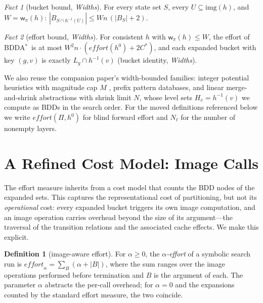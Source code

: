 \documentclass[letterpaper]{article}
\newcommand{\task}{\ensuremath{\Pi}}
\newcommand{\hblind}{\ensuremath{h^{0}}}
\newcommand{\copt}{\ensuremath{C^{*}}}
\newcommand{\width}{\ensuremath{\mathsf{w}}}
\newcommand{\effort}{\ensuremath{\mathit{effort}}}
\newcommand{\img}{\ensuremath{\mathrm{img}}}
\newcommand{\bddastar}{BDDA\ensuremath{^{*}}}
\theoremstyle{plain}
\theoremstyle{definition}
\newtheorem{definition}{Definition}
\theoremstyle{remark}
\newtheorem{fact}{Fact}
\begin{document}
\begin{fact}[bucket bound, \emph{Widths}]
\label{thm-bucket}
For every state set $S$, every $U \subseteq \img(h)$, and
$W = \width_\pi(h)$:
$|B_{S \cap h^{-1}(U)}| \leq W n \, (|B_S| + 2)$.
\end{fact}

\begin{fact}[effort bound, \emph{Widths}]
\label{thm-effort}
For consistent $h$ with $\width_\pi(h) \leq W$, the effort of \bddastar\
is at most $W^2 n \cdot (\mathit{effort}(\hblind) + 2\copt)$, and each
expanded bucket with key $(g,v)$ is exactly $L_g \cap h^{-1}(v)$
(bucket identity, \emph{Widths}).
\end{fact}

We also reuse the companion paper's width-bounded families: integer
potential heuristics with magnitude cap $M$
\citep{fiser-et-al-aij2024}, prefix pattern databases, and linear
merge-and-shrink abstractions \citep{helmert-et-al-jacm2014} with shrink
limit $N$, whose level sets $H_v = h^{-1}(v)$ we compute as BDDs in the
search order. For the moved definitions referenced below we write
$\effort(\task, \hblind)$ for blind forward effort and
$N_\ell$ for the number of nonempty layers.

\section{A Refined Cost Model: Image Calls}
\label{sec-cost}

The effort measure inherits from \citet{speck-et-al-icaps2020} a
cost model that counts the BDD nodes of the expanded sets. This captures
the representational cost of partitioning, but not its \emph{operational}
cost: every expanded bucket triggers its own image computation, and an
image operation carries overhead beyond the size of its argument---the
traversal of the transition relations and the associated cache
effects. We make this explicit.

\begin{definition}[image-aware effort]
\label{def-image-effort}
For $\alpha \geq 0$, the \emph{$\alpha$-effort} of a symbolic search run
is $\effort_\alpha = \sum_{B} (\alpha + |B|)$, where the sum ranges over
the image operations performed before termination and $B$ is the
argument of each. The parameter $\alpha$ abstracts the per-call
overhead; for $\alpha = 0$ and the expansions counted by
the standard effort measure, the two coincide.
\end{definition}
\end{document}
